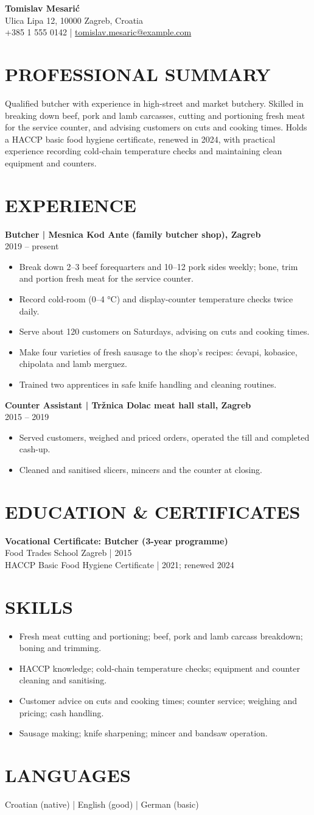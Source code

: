 \documentclass[11pt,a4paper]{article}
\newcommand{\cvsection}[1]{\section*{#1}}
\begin{document}
{\LARGE\bfseries\color{primarycolor} Tomislav Mesarić}\\[0.3em]
Ulica Lipa 12, 10000 Zagreb, Croatia\\
+385 1 555 0142 | \href{mailto:tomislav.mesaric@example.com}{tomislav.mesaric@example.com}

\cvsection{PROFESSIONAL SUMMARY}
Qualified butcher with experience in high-street and market butchery. Skilled in breaking down beef, pork and lamb carcasses, cutting and portioning fresh meat for the service counter, and advising customers on cuts and cooking times. Holds a HACCP basic food hygiene certificate, renewed in 2024, with practical experience recording cold-chain temperature checks and maintaining clean equipment and counters.

\cvsection{EXPERIENCE}
\textbf{Butcher | Mesnica Kod Ante (family butcher shop), Zagreb}\\
2019 – present
\begin{itemize}
\item Break down 2–3 beef forequarters and 10–12 pork sides weekly; bone, trim and portion fresh meat for the service counter.
\item Record cold-room (0–4 °C) and display-counter temperature checks twice daily.
\item Serve about 120 customers on Saturdays, advising on cuts and cooking times.
\item Make four varieties of fresh sausage to the shop's recipes: ćevapi, kobasice, chipolata and lamb merguez.
\item Trained two apprentices in safe knife handling and cleaning routines.
\end{itemize}

\textbf{Counter Assistant | Tržnica Dolac meat hall stall, Zagreb}\\
2015 – 2019
\begin{itemize}
\item Served customers, weighed and priced orders, operated the till and completed cash-up.
\item Cleaned and sanitised slicers, mincers and the counter at closing.
\end{itemize}

\cvsection{EDUCATION \& CERTIFICATES}
\textbf{Vocational Certificate: Butcher (3-year programme)}\\
Food Trades School Zagreb | 2015\\
HACCP Basic Food Hygiene Certificate | 2021; renewed 2024

\cvsection{SKILLS}
\begin{itemize}
\item Fresh meat cutting and portioning; beef, pork and lamb carcass breakdown; boning and trimming.
\item HACCP knowledge; cold-chain temperature checks; equipment and counter cleaning and sanitising.
\item Customer advice on cuts and cooking times; counter service; weighing and pricing; cash handling.
\item Sausage making; knife sharpening; mincer and bandsaw operation.
\end{itemize}

\cvsection{LANGUAGES}
Croatian (native) | English (good) | German (basic)
\end{document}
